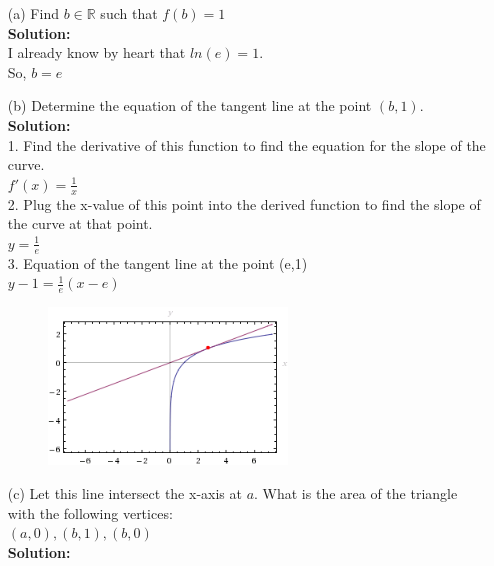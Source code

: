 \documentclass[a4paper]{article}
\begin{document}
\begin{enumerate}
\begin{enumerate}
	\item[(a)] Find $b \in \mathbb{R}$ such that $f(b) = 1$\\
	\textbf{Solution:}\\
	
I already know by heart that $ln(e) = 1$.\\ So, $b = e$\\
	
	
	
	
	\item[(b)] Determine the equation of the tangent line at the point $(b,1)$.\\
	\textbf{Solution:}\\
	
1. Find the derivative of this function to find the equation for the slope of the curve.\\

$f'(x) = \frac{1}{x}$\\
	
2. Plug the x-value of this point into the derived function to find the slope of the curve at that point.\\

$y = \frac{1}{e}$\\
	
	
3. Equation of the tangent line at the point (e,1)\\

$y - 1 = \frac{1}{e}(x - e)$\\
	
	
\begin{figure}[ht]
	\centering
  \includegraphics[width=0.6\textwidth]{tangent.png}
\end{figure}	
	
\newpage	
	
	
	
	
	\item[(c)] Let this line intersect the x-axis at $a$. What is the area of the triangle with the following vertices:\\
	$(a,0),(b,1),(b,0)$\\
	\textbf{Solution:}\\
	

\end{enumerate}
\end{enumerate}
\end{document}
